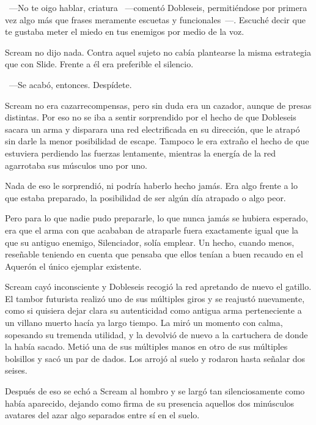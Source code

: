 ~---No te oigo hablar, criatura ~---comentó Dobleseis, permitiéndose por primera vez algo más que frases meramente escuetas y funcionales~---. Escuché decir que te gustaba meter el miedo en tus enemigos por medio de la voz.

Scream no dijo nada. Contra aquel sujeto no cabía plantearse la misma estrategia que con Slide. Frente a él era preferible el silencio.

~---Se acabó, entonces. Despídete.

Scream no era cazarrecompensas, pero sin duda era un cazador, aunque de presas distintas. Por eso no se iba a sentir sorprendido por el hecho de que Dobleseis sacara un arma y disparara una red electrificada en su dirección, que le atrapó sin darle la menor posibilidad de escape. Tampoco le era extraño el hecho de que estuviera perdiendo las fuerzas lentamente, mientras la energía de la red agarrotaba sus músculos uno por uno.

Nada de eso le sorprendió, ni podría haberlo hecho jamás. Era algo frente a lo que estaba preparado, la posibilidad de ser algún día atrapado o algo peor.

Pero para lo que nadie pudo prepararle, lo que nunca jamás se hubiera esperado, era que el arma con que acababan de atraparle fuera exactamente igual que la que su antiguo enemigo, Silenciador, solía emplear. Un hecho, cuando menos, reseñable teniendo en cuenta que pensaba que ellos tenían a buen recaudo en el Aquerón el único ejemplar existente.

Scream cayó inconsciente y Dobleseis recogió la red apretando de nuevo el gatillo. El tambor futurista realizó uno de sus múltiples giros y se reajustó nuevamente, como si quisiera dejar clara su autenticidad como antigua arma perteneciente a un villano muerto hacía ya largo tiempo. La miró un momento con calma, sopesando su tremenda utilidad, y la devolvió de nuevo a la cartuchera de donde la había sacado. Metió una de sus múltiples manos en otro de sus múltiples bolsillos y sacó un par de dados. Los arrojó al suelo y rodaron hasta señalar dos seises.

Después de eso se echó a Scream al hombro y se largó tan silenciosamente como había aparecido, dejando como firma de su presencia aquellos dos minúsculos avatares del azar algo separados entre sí en el suelo.
